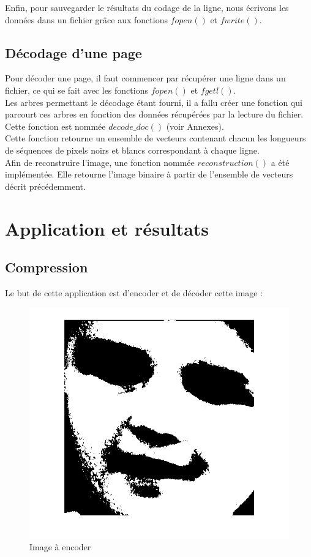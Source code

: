 \documentclass[11pt]{article}
\begin{document}
  Enfin, pour sauvegarder le résultats du codage de la ligne, nous écrivons les données dans un fichier grâce aux fonctions $fopen()$ et $fwrite()$.
  
  \subsection{Décodage d'une page}
  
  Pour décoder une page, il faut commencer par récupérer une ligne dans un fichier, ce qui se fait avec les fonctions $fopen()$ et $fgetl()$.\\
  Les arbres permettant le décodage étant fourni, il a fallu créer une fonction qui parcourt ces arbres en fonction des données récupérées par la lecture du fichier. Cette fonction est nommée $decode\_doc()$ (voir Annexes).\\
  Cette fonction retourne un ensemble de vecteurs contenant chacun les longueurs de séquences de pixels noirs et blancs correspondant à chaque ligne.\\
  Afin de reconstruire l'image, une fonction nommée $reconstruction()$ a été implémentée. Elle retourne l'image binaire à partir de l'ensemble de vecteurs décrit précédemment.

\newpage

\section{Application et résultats}
  
  \subsection{Compression}
  
  Le but de cette application est d'encoder et de décoder cette image :
  
  	\begin{figure}[H]
  	  \centering
  	  \includegraphics[scale=0.6]{img/img_ori.png}
  	  \caption{Image à encoder}
  	  \label{img1}
  	\end{figure}
\end{document}
